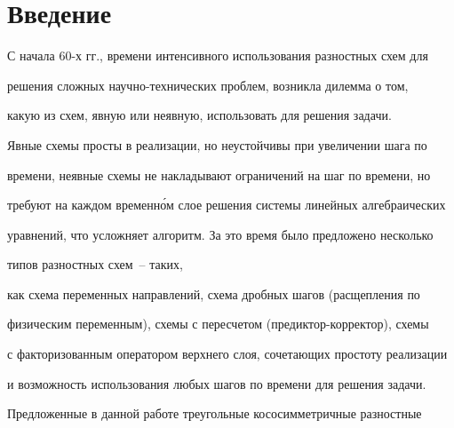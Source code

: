 \date{}




\pagestyle{plain} %







\maketitle


\label{begin}








\section{Введение}





С начала 60-х гг., времени интенсивного использования разностных схем для 


решения сложных научно-технических проблем, возникла дилемма о том, 


какую из схем, явную или неявную, использовать для решения задачи. 


Явные схемы просты в реализации, но неустойчивы при увеличении шага по 


времени, неявные схемы не накладывают ограничений на шаг по времени, но 


требуют на каждом временн\'ом слое решения системы линейных алгебраических 


уравнений, что усложняет алгоритм. За это время было предложено несколько 


типов разностных схем~\cite{subbotinabib1}--\cite{subbotinabib5} таких,


как схема переменных направлений, схема дробных шагов (расщепления по 


физическим переменным), схемы с пересчетом (предиктор-корректор), схемы 


с факторизованным оператором верхнего слоя, сочетающих простоту реализации 


и возможность использования любых шагов по времени для решения задачи.





Предложенные в данной работе треугольные кососимметричные разностные 


